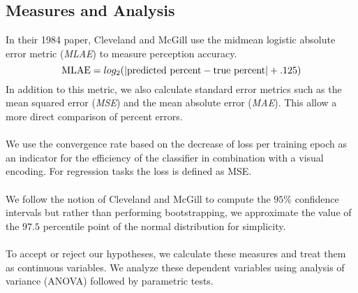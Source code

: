 \subsection{Measures and Analysis}

 In their 1984 paper, Cleveland and McGill use the midmean logistic absolute error metric (\emph{MLAE}) to measure perception accuracy.
\begin{equation}
	\textnormal{MLAE} = log_2( | \textnormal{predicted percent} - \textnormal{true percent} | + .125)
\end{equation}
In addition to this metric, we also calculate standard error metrics such as the mean squared error (\emph{MSE}) and the mean absolute error (\emph{MAE}). This allow a more direct comparison of percent errors.
\\~\\
 We use the convergence rate based on the decrease of loss per training epoch as an indicator for the efficiency of the classifier in combination with a visual encoding. For regression tasks the loss is defined as MSE.%
\\~\\
 We follow the notion of Cleveland and McGill to compute the $95\%$ confidence intervals but rather than performing bootstrapping, we approximate the value of the $97.5$ percentile point of the normal distribution for simplicity.
\\~\\
 To accept or reject our hypotheses, we calculate these measures and treat them as continuous variables. We analyze these dependent variables using analysis of variance (ANOVA) followed by parametric tests.
